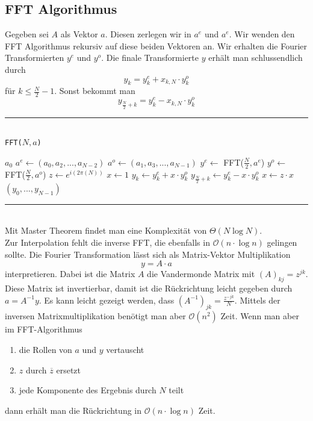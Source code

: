 \documentclass[a4paper, 12pt]{article}
\begin{document}
	\subsection{FFT Algorithmus}
	Gegeben sei $A$ als Vektor $a$. Diesen zerlegen wir in $a^e$ und $a^e$. Wir wenden den FFT Algorithmus rekursiv auf diese beiden Vektoren an. Wir erhalten die Fourier Transformierten $y^e$ und $y^o$. Die finale Transformierte $y$ erhält man schlussendlich durch \[y_k = y_k^e + x_{k,N}\cdot y_k^o\] für $k \leq \frac{N}{2}-1$. Sonst bekommt man \[y_{\frac{N}{2}+k} = y_k^e - x_{k,N}\cdot y_k^o\]
	\par\noindent\rule{\textwidth}{0.4pt}\\
	\texttt{FFT($N,a$)}
	\begin{algorithmic}[1]
		\Return $a_0$
		\Else
		\State $a^e \gets (a_0,a_2,...,a_{N-2})$
		\State $a^o \gets (a_1,a_3,...,a_{N-1})$
		\State $y^e \gets$ FFT($\frac{N}{2},a^e$)
		\State $y^o \gets$ FFT($\frac{N}{2},a^o$)
		\State $z \gets e^{i(2\pi(N))}$
		\State $x \gets 1$
		\State $y_k \gets y_k^e + x\cdot y_k^o$
		\State $y_{\frac{N}{2}+k} \gets y_k^e - x\cdot y_k^o$
		\State $x \gets z\cdot x$
		\EndFor
		\EndIf\\
		\Return $(y_0,...,y_{N-1})$ 
	\end{algorithmic}
	\par\noindent\rule{\textwidth}{0.4pt}\\
	Mit Master Theorem findet man eine Komplexität von $\Theta(N\log N)$.\\
	
	Zur Interpolation fehlt die inverse FFT, die ebenfalls in $\mathcal{O}(n\cdot \log n)$ gelingen sollte. Die Fourier Transformation lässt sich als Matrix-Vektor Multiplikation \[y = A \cdot a\] interpretieren. Dabei ist die Matrix $A$ die Vandermonde Matrix mit $(A)_{kj} = z^{jk}$. Diese Matrix ist invertierbar, damit ist die Rückrichtung leicht gegeben durch $a = A^{-1}y$. Es kann leicht gezeigt werden, dass $(A^{-1})_{jk} = \frac{z^{-jk}}{N}$. Mittels der inversen Matrixmultiplikation benötigt man aber $\mathcal{O}(n^2)$ Zeit. Wenn man aber im FFT-Algorithmus \begin{enumerate}
		\item die Rollen von $a$ und $y$ vertauscht
		\item $z$ durch $\overline{z}$ ersetzt
		\item jede Komponente des Ergebnis durch $N$ teilt
	\end{enumerate}
	dann erhält man die Rückrichtung in $\mathcal{O}(n\cdot \log n)$ Zeit.\\
	
\end{document}
